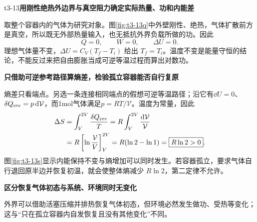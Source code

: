 \begin{drillsolution}{t3-13}\textbf{用刚性绝热外边界与真空阻力确定实际热量、功和内能差}\par\nobreak
取整个容器内的气体为研究对象。图\ref{fig:t3-13q}中外壁刚性、绝热，气体扩散前方是真空，所以既无外部热量输入，也无抵抗外界负载所做的功。因此
\[\boxed{Q=0,\qquad W=0,\qquad \Delta U=0}.\]
理想气体量不变，$\Delta U=C_V(T_f-T_i)$ 给出 $T_f=T_i$。温度不变是能量守恒的结论，不能反过来把自由膨胀当成可逆等温过程而算出对数功。



\par\medskip{}\noindent\textbf{只借助可逆参考路径算熵差，检验孤立容器能否自行复原}\par\nobreak
熵差只看端点。另选一条连接相同端点的假想可逆等温路径；沿它有$\dd U=0$、$\delta Q_{\rm rev}=p\mathop{}\!\mathrm d\mathcal V$，而1mol气体满足$p=RT/\mathcal V$。温度为常量，因此
\[
\begin{aligned}
\Delta S&=\int_V^{2V}\frac{\delta Q_{\rm rev}}{T}
=R\int_V^{2V}\frac{\mathop{}\!\mathrm d\mathcal V}{\mathcal V}\\
&=R\left[\ln\frac{\mathcal V}{V}\right]_V^{2V}
=R(\ln2-\ln1)=\boxed{R\ln2>0}.
\end{aligned}
\]
图\ref{fig:t3-13s}显示内能保持不变与熵增加可以同时发生。若容器孤立，要求气体自行退回原半边并恢复初温，就会使整体熵减少 $R\ln2$，第二定律不允许。


\par\medskip{}\noindent\textbf{区分恢复气体初态与系统、环境同时无变化}\par\nobreak
外界可以借助活塞压缩并排热恢复气体初态，但环境必然发生做功、受热等变化；这与“只在孤立容器内自发恢复且没有其他变化”不同。
\end{drillsolution}
